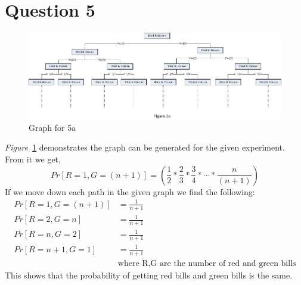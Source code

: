 \documentclass[11pt]{article}
\begin{document}
\section*{Question 5}
\begin{figure}[h]
\centering
\includegraphics[scale=0.55]{Question5a_Figure1.jpg}
\caption{Graph for 5a}
\label{fig:fig1}
\end{figure}
\emph{Figure}~\ref{fig:fig1} demonstrates the graph can be generated for the given experiment. From it we get,
\begin{equation*}
Pr[R=1,G=(n+1)] = \left(\frac{1}{2}*\frac{2}{3}*\frac{3}{4}*\dotsm *\frac{n}{(n+1)}\right)
\end{equation*}
If we move down each path in the given graph we find the following:
\begin{equation*}
\begin{split}
Pr[R=1,G=(n+1)] &= \frac{1}{n+1}\\
Pr[R=2,G=n] &= \frac{1}{n+1}\\
Pr[R=n,G=2] &=\frac{1}{n+1}\\
Pr[R=n+1,G=1] &= \frac{1}{n+1}\\
&\text{where R,G are the number of red and green bills}
\end{split}
\end{equation*}
This shows that the probability of getting red bills and green bills is the same.
\end{document}
